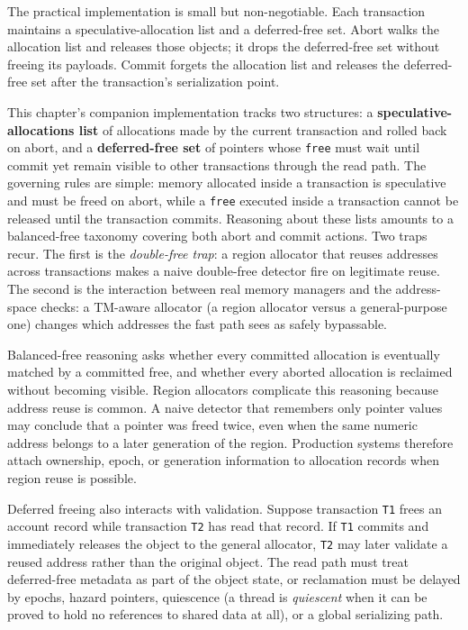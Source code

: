 The practical implementation is small but non-negotiable.  Each transaction maintains a speculative-allocation list and a deferred-free set.  Abort walks the allocation list and releases those objects; it drops the deferred-free set without freeing its payloads.  Commit forgets the allocation list and releases the deferred-free set after the transaction's serialization point.

This chapter's companion implementation tracks two structures: a \textbf{speculative-allocations list} of allocations made by the current transaction and rolled back on abort, and a \textbf{deferred-free set} of pointers whose \texttt{free} must wait until commit yet remain visible to other transactions through the read path. The governing rules are simple: memory allocated inside a transaction is speculative and must be freed on abort, while a \texttt{free} executed inside a transaction cannot be released until the transaction commits. Reasoning about these lists amounts to a balanced-free taxonomy covering both abort and commit actions. Two traps recur. The first is the \emph{double-free trap}: a region allocator that reuses addresses across transactions makes a naive double-free detector fire on legitimate reuse. The second is the interaction between real memory managers and the address-space checks: a TM-aware allocator (a region allocator versus a general-purpose one) changes which addresses the fast path sees as safely bypassable.

Balanced-free reasoning asks whether every committed allocation is eventually matched by a committed free, and whether every aborted allocation is reclaimed without becoming visible.  Region allocators complicate this reasoning because address reuse is common.  A naive detector that remembers only pointer values may conclude that a pointer was freed twice, even when the same numeric address belongs to a later generation of the region.  Production systems therefore attach ownership, epoch, or generation information to allocation records when region reuse is possible.

Deferred freeing also interacts with validation.  Suppose transaction \texttt{T1} frees an account record while transaction \texttt{T2} has read that record.  If \texttt{T1} commits and immediately releases the object to the general allocator, \texttt{T2} may later validate a reused address rather than the original object.  The read path must treat deferred-free metadata as part of the object state, or reclamation must be delayed by epochs, hazard pointers, quiescence (a thread is \emph{quiescent} when it can be proved to hold no references to shared data at all), or a global serializing path.

